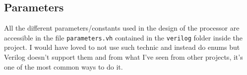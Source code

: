 \subsection{Parameters}
All the different parameters/constants used in the design of the processor are accessible in the file \texttt{parameters.vh} 
contained in the \texttt{verilog} folder inside the project.
I would have loved to not use such technic and instead do enums but Verilog doesn't support them and from what I've seen
from other projects, it's one of the most common ways to do it. \\
